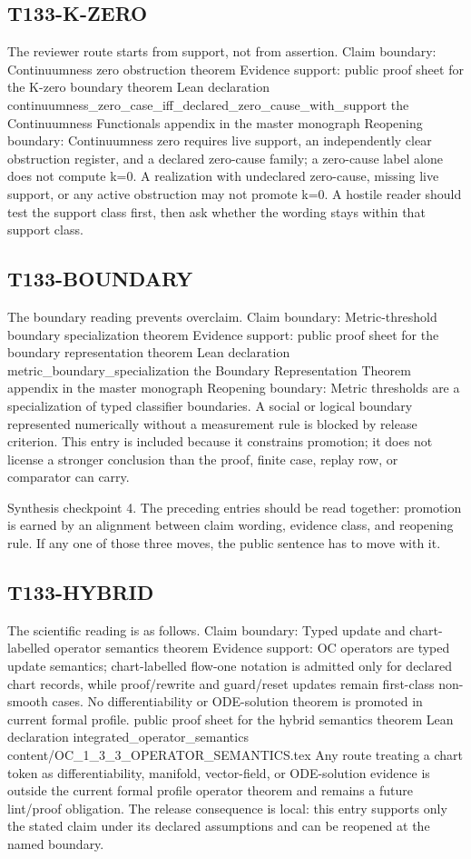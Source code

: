 \subsection{T133-K-ZERO}
The reviewer route starts from support, not from assertion. Claim boundary: Continuumness zero obstruction theorem Evidence support: public proof sheet for the K-zero boundary theorem Lean declaration continuumness\_zero\_case\_iff\_declared\_zero\_cause\_with\_support the Continuumness Functionals appendix in the master monograph Reopening boundary: Continuumness zero requires live support, an independently clear obstruction register, and a declared zero-cause family; a zero-cause label alone does not compute k=0. A realization with undeclared zero-cause, missing live support, or any active obstruction may not promote k=0. A hostile reader should test the support class first, then ask whether the wording stays within that support class.

\subsection{T133-BOUNDARY}
The boundary reading prevents overclaim. Claim boundary: Metric-threshold boundary specialization theorem Evidence support: public proof sheet for the boundary representation theorem Lean declaration metric\_boundary\_specialization the Boundary Representation Theorem appendix in the master monograph Reopening boundary: Metric thresholds are a specialization of typed classifier boundaries. A social or logical boundary represented numerically without a measurement rule is blocked by release criterion. This entry is included because it constrains promotion; it does not license a stronger conclusion than the proof, finite case, replay row, or comparator can carry.

Synthesis checkpoint 4. The preceding entries should be read together: promotion is earned by an alignment between claim wording, evidence class, and reopening rule. If any one of those three moves, the public sentence has to move with it.

\subsection{T133-HYBRID}
The scientific reading is as follows. Claim boundary: Typed update and chart-labelled operator semantics theorem Evidence support: OC operators are typed update semantics; chart-labelled flow-one notation is admitted only for declared chart records, while proof/rewrite and guard/reset updates remain first-class non-smooth cases. No differentiability or ODE-solution theorem is promoted in current formal profile. public proof sheet for the hybrid semantics theorem Lean declaration integrated\_operator\_semantics content/OC\_1\_3\_3\_OPERATOR\_SEMANTICS.tex Any route treating a chart token as differentiability, manifold, vector-field, or ODE-solution evidence is outside the current formal profile operator theorem and remains a future lint/proof obligation. The release consequence is local: this entry supports only the stated claim under its declared assumptions and can be reopened at the named boundary.

